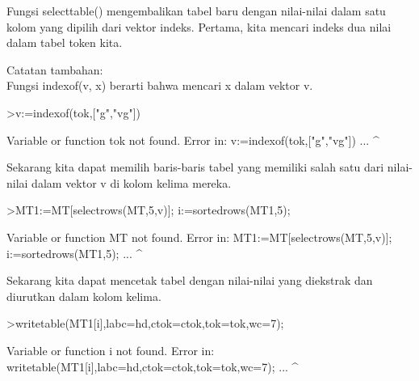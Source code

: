 \documentclass[12pt,arial,letterpaper]{book}
\begin{document}
\begin{eulercomment}
\begin{eulercomment}
\begin{eulercomment}
\begin{eulercomment}
\begin{eulercomment}
\begin{eulercomment}
\begin{eulercomment}
\begin{eulercomment}
\begin{eulercomment}
\begin{eulercomment}
\begin{eulercomment}
\begin{eulercomment}
\begin{eulercomment}
\begin{eulercomment}
\begin{eulercomment}
\begin{eulercomment}
\begin{eulercomment}
\begin{eulercomment}
\begin{eulercomment}
\begin{eulercomment}
\begin{eulercomment}
\begin{eulercomment}
\begin{eulercomment}
\begin{eulercomment}
\begin{eulercomment}
\begin{eulercomment}
\begin{eulercomment}
\begin{eulercomment}
\begin{eulercomment}
\begin{eulercomment}
\begin{eulercomment}
\begin{eulercomment}
\begin{eulercomment}
Fungsi selecttable() mengembalikan tabel baru dengan nilai-nilai dalam
satu kolom yang dipilih dari vektor indeks. Pertama, kita mencari
indeks dua nilai dalam tabel token kita.

Catatan tambahan:\\
Fungsi indexof(v, x) berarti bahwa mencari x dalam vektor v.
\end{eulercomment}
\begin{eulerprompt}
>v:=indexof(tok,["g","vg"])
\end{eulerprompt}
\begin{euleroutput}
  Variable or function tok not found.
  Error in:
  v:=indexof(tok,["g","vg"]) ...
                ^
\end{euleroutput}
\begin{eulercomment}
Sekarang kita dapat memilih baris-baris tabel yang memiliki salah satu
dari nilai-nilai dalam vektor v di kolom kelima mereka.
\end{eulercomment}
\begin{eulerprompt}
>MT1:=MT[selectrows(MT,5,v)]; i:=sortedrows(MT1,5);
\end{eulerprompt}
\begin{euleroutput}
  Variable or function MT not found.
  Error in:
  MT1:=MT[selectrows(MT,5,v)]; i:=sortedrows(MT1,5); ...
                       ^
\end{euleroutput}
\begin{eulercomment}
Sekarang kita dapat mencetak tabel dengan nilai-nilai yang diekstrak
dan diurutkan dalam kolom kelima.
\end{eulercomment}
\begin{eulerprompt}
>writetable(MT1[i],labc=hd,ctok=ctok,tok=tok,wc=7);
\end{eulerprompt}
\begin{euleroutput}
  Variable or function i not found.
  Error in:
  writetable(MT1[i],labc=hd,ctok=ctok,tok=tok,wc=7); ...
                  ^

\end{euleroutput}
\end{eulercomment}
\end{eulercomment}
\end{eulercomment}
\end{eulercomment}
\end{eulercomment}
\end{eulercomment}
\end{eulercomment}
\end{eulercomment}
\end{eulercomment}
\end{eulercomment}
\end{eulercomment}
\end{eulercomment}
\end{eulercomment}
\end{eulercomment}
\end{eulercomment}
\end{eulercomment}
\end{eulercomment}
\end{eulercomment}
\end{eulercomment}
\end{eulercomment}
\end{eulercomment}
\end{eulercomment}
\end{eulercomment}
\end{eulercomment}
\end{eulercomment}
\end{eulercomment}
\end{eulercomment}
\end{eulercomment}
\end{eulercomment}
\end{eulercomment}
\end{eulercomment}
\end{eulercomment}
\end{document}
